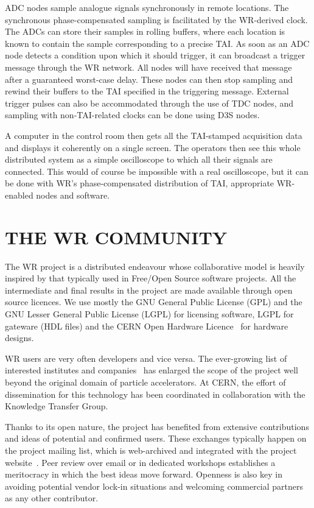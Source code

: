 \documentclass{../JAC2003}
\begin{document}
ADC nodes sample analogue signals synchronously in remote
locations. The synchronous phase-compensated sampling is facilitated
by the WR-derived clock. The ADCs can store their samples in rolling
buffers, where each location is known to contain the sample
corresponding to a precise TAI. As soon as an ADC node detects a
condition upon which it should trigger, it can broadcast a trigger
message through the WR network. All nodes will have received that
message after a guaranteed worst-case delay. These nodes can then stop
sampling and rewind their buffers to the TAI specified in the
triggering message. External trigger pulses can also be accommodated
through the use of TDC nodes, and sampling with non-TAI-related clocks
can be done using D3S nodes.

A computer in the control room then gets all the TAI-stamped
acquisition data and displays it coherently on a single screen. The
operators then see this whole distributed system as a simple
oscilloscope to which all their signals are connected. This would of
course be impossible with a real oscilloscope, but it can be done with
WR's phase-compensated distribution of TAI, appropriate WR-enabled
nodes and software. 

\section{THE WR COMMUNITY}

The WR project is a distributed endeavour whose collaborative model is
heavily inspired by that typically used in Free/Open Source software
projects. All the intermediate and final results in the project are
made available through open source licences. We use mostly the GNU
General Public License (GPL) and the GNU Lesser General Public License
(LGPL) for licensing software, LGPL for gateware (HDL files) and the
CERN Open Hardware Licence~\cite{cernohl-ref} for hardware designs.

WR users are very often developers and vice versa. The ever-growing
list of interested institutes and companies~\cite{wr-users-ref} has
enlarged the scope of the project well beyond the original domain of
particle accelerators. At CERN, the effort of dissemination for this
technology has been coordinated in collaboration with the Knowledge
Transfer Group.

Thanks to its open nature, the project has benefited from extensive
contributions and ideas of potential and confirmed users. These
exchanges typically happen on the project mailing list, which is
web-archived and integrated with the project
website~\cite{white-rabbit-ref}. Peer review over email or in
dedicated workshops establishes a meritocracy in which the best ideas
move forward. Openness is also key in avoiding potential vendor
lock-in situations and welcoming commercial partners as any other
contributor. 
\end{document}
